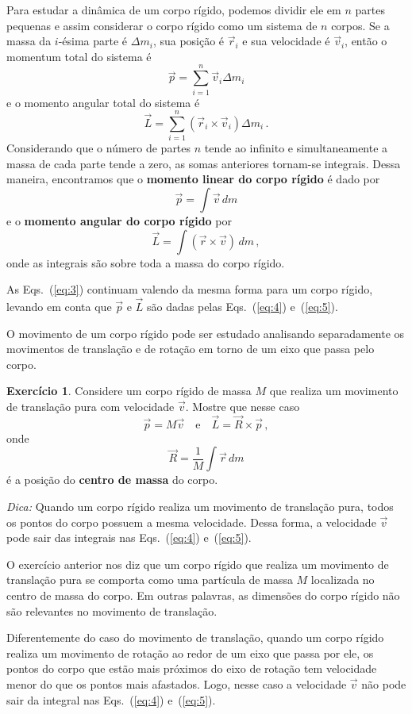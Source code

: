 \documentclass[12pt,a4paper]{article}
\theoremstyle{definition}
\newtheorem{ex}{Exercício}[section]
\begin{document}
Para estudar a dinâmica de um corpo rígido, podemos dividir ele em $n$
partes pequenas e assim considerar o corpo rígido como um sistema de
$n$ corpos. Se a massa da $i$-ésima parte é $\Delta m_i$, sua posição
é $\vec r_i$ e sua velocidade é $\vec v_i$, então o momentum total do
sistema é
$$\vec p=\sum_{i=1}^n\vec v_i\Delta m_i$$
e o momento angular total do sistema é
$$\vec L=\sum_{i=1}^n(\vec r_i\times\vec v_i)\Delta m_i\,.$$
Considerando que o número de partes $n$ tende ao infinito e
simultaneamente a massa de cada parte tende a zero, as somas
anteriores tornam-se integrais. Dessa maneira, encontramos que o
\textbf{momento linear do corpo rígido} é dado por
\begin{equation}
  \label{eq:4}
  \vec p=\int \vec v\,dm
\end{equation}
e o \textbf{momento angular do corpo rígido} por
\begin{equation}
  \label{eq:5}
  \vec L=\int (\vec r\times\vec v)\,dm\,,
\end{equation}
onde as integrais são sobre toda a massa do corpo rígido.

As Eqs.~(\ref{eq:3}) continuam valendo da mesma forma para um corpo
rígido, levando em conta que $\vec p$ e $\vec L$ são dadas pelas
Eqs.~(\ref{eq:4}) e~(\ref{eq:5}).

O movimento de um corpo rígido pode ser estudado analisando
separadamente os movimentos de translação e de rotação em torno de um
eixo que passa pelo corpo.

\begin{ex}
  Considere um corpo rígido de massa $M$ que realiza um movimento de
  translação pura com velocidade $\vec v$. Mostre que nesse caso
  $$\vec p=M\vec v\quad\text{e}\quad\vec L=\vec R\times\vec p\,,$$
  onde
  $$\vec R=\frac{1}{M}\int \vec r\,dm$$
  é a posição do \textbf{centro de massa} do corpo.

  \noindent\textit{Dica:} Quando um corpo rígido realiza um movimento de translação pura, todos os pontos do corpo possuem a mesma velocidade. Dessa forma, a
  velocidade $\vec v$ pode sair das integrais nas Eqs.~(\ref{eq:4})
  e~(\ref{eq:5}).
\end{ex}

O exercício anterior nos diz que um corpo rígido que realiza um
movimento de translação pura se comporta como uma partícula de massa
$M$ localizada no centro de massa do corpo. Em outras palavras, as
dimensões do corpo rígido não são relevantes no movimento de
translação.

Diferentemente do caso do movimento de trans\-la\-ção, quando um corpo
rígido realiza um movimento de rotação ao redor de um eixo que passa
por ele, os pontos do corpo que estão mais próximos do eixo de rotação
tem velocidade menor do que os pontos mais afastados. Logo, nesse caso
a velocidade $\vec v$ não pode sair da integral nas Eqs.~(\ref{eq:4})
e~(\ref{eq:5}).
\end{document}

